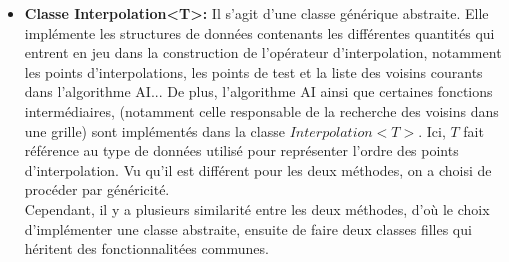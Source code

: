 \begin{itemize}
\item \textbf{Classe Interpolation<T>:} Il s'agit d'une classe générique abstraite. Elle implémente les structures de données contenants les différentes quantités qui entrent
en jeu dans la construction de l'opérateur d'interpolation, notamment les points d'interpolations, les points de test et
la liste des voisins courants dans l'algorithme AI... De plus, l'algorithme AI ainsi que certaines fonctions intermédiaires,
(notamment celle responsable de la recherche des voisins dans une grille) sont implémentés dans la classe $Interpolation<T>$.
Ici, $T$ fait référence au type de données utilisé pour représenter l'ordre des points d'interpolation. Vu qu'il est différent pour les deux méthodes, on a choisi de procéder par généricité.\\
Cependant, il y a plusieurs similarité entre les deux méthodes, d'où le choix d'implémenter une classe abstraite, ensuite de faire deux classes filles qui héritent des fonctionnalitées communes.


\end{itemize}
